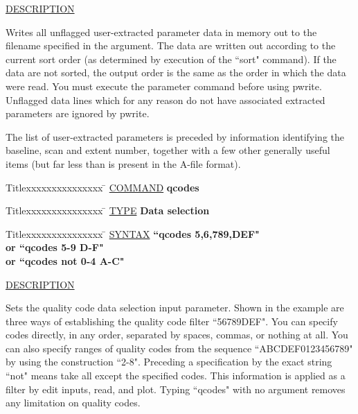 \underline{DESCRIPTION}
\begin{list}{}{\setlength{\leftmargin}{0.5in}
     \setlength{\rightmargin}{0in}}
\item
Writes all unflagged user-extracted parameter data in memory out 
to the filename specified in the argument.  The data are written out
according to the current sort order (as determined by
execution of the ``sort" command).  If the data are not
sorted, the output order is the same as the order in
which the data were read.  You must execute the parameter command
before using pwrite.  Unflagged data lines which for any reason
do not have associated extracted parameters are ignored by pwrite.
\item
The list of user-extracted parameters is preceded by information
identifying the baseline, scan and extent number, together with
a few other generally useful items (but far less than is present
in the A-file format).
\end{list}
\vspace{.2in}

\begin{tabbing}
Titlexxxxxxxxxxxxxxx \= \kill
\underline{COMMAND} \> {\bf 	qcodes} \\
\end{tabbing}

\begin{tabbing}
Titlexxxxxxxxxxxxxxx \= \kill
\underline{TYPE} \> {\bf 		Data selection} \\
\end{tabbing}

\begin{tabbing}
Titlexxxxxxxxxxxxxxx \= \kill
\underline{SYNTAX} \> {\bf 		``qcodes 5,6,789,DEF"} \\
\> {\bf 	    or  ``qcodes 5-9 D-F"} \\
\> {\bf 	    or  ``qcodes not 0-4 A-C"} \\
\end{tabbing}

\underline{DESCRIPTION}
\begin{list}{}{\setlength{\leftmargin}{0.5in}
     \setlength{\rightmargin}{0in}}
\item
Sets the quality code data selection input parameter.  Shown
in the example are three ways of establishing the quality code
filter ``56789DEF".  You can specify codes directly, in any order,
separated by spaces, commas, or nothing at all.  You can also
specify ranges of quality codes from the sequence ``ABCDEF0123456789"
by using the construction ``2-8".  Preceding a specification by the
exact string ``not" means take all except the specified codes.  This
information is applied as a filter by edit inputs, read, and plot.
Typing ``qcodes" with no argument removes any limitation on quality
codes.
\end{list}
\vspace{.2in}

